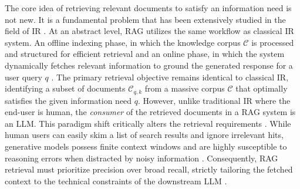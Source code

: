 The core idea of retrieving relevant documents to satisfy an information need is not new. It is a fundamental problem that has been extensively studied in the field of \acf{IR} \cite{manning2008introduction}. At an abstract level, \ac{RAG} utilizes the same workflow as classical \ac{IR} system. An offline indexing phase, in which the knowledge corpus $\mathcal{C}$ is processed and structured for efficient retrieval and an online phase, in which the system dynamically fetches relevant information to ground the generated response for a user query $q$ \cite{gao_2024_rag}. The primary retrieval objective remains identical to classical \ac{IR}, identifying a subset of documents $\mathcal{C}_{q,k}$ from a massive corpus $\mathcal{C}$ that optimally satisfies the given information need $q$. However, unlike traditional \ac{IR} where the end-user is human, the \emph{consumer} of the retrieved documents in a \ac{RAG} system is an \ac{LLM}. This paradigm shift critically alters the retrieval requirements \cite{gao_2024_rag}. While human users can easily skim a list of search results and ignore irrelevant hits, generative models possess finite context windows and are highly susceptible to reasoning errors when distracted by noisy information \cite{Liu2023_LostInTheMiddle}. Consequently, \ac{RAG} retrieval must prioritize precision over broad recall, strictly tailoring the fetched context to the technical constraints of the downstream \ac{LLM} \cite{gao_2024_rag, Yoran2023MakingRL}.





